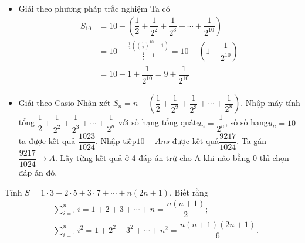 \begin{ex}
{\begin{itemize}
\begin{itemize}
\begin{align*}
					 2M&=1+\dfrac{1}{2}+\dfrac{1}{2^2}+\cdots+\dfrac{1}{2^{n-1}}\\
					\Rightarrow 2M-M&=\left(  1+\dfrac{1}{2}+\dfrac{1}{2^2}+\cdots+\dfrac{1}{2^{n-1}}\right) 1+\dfrac{1}{2}+\dfrac{1}{2^2}+\cdots+\dfrac{1}{2^{n-1}}-\left( \dfrac{1}{2}+\dfrac{1}{2^2}+\dfrac{1}{2^3}+\cdots+\dfrac{1}{2^n}\right)
				\end{align*}
				Suy ra  $M =1-\dfrac{1}{2^n}$.
				Suy ra $ S_n=n-(1-\dfrac{1}{2^n})=n-1+\dfrac{1}{2^n}$. 
				Suy ra $\Rightarrow S_{10}=10-1+\dfrac{1}{2^{10}}=9+\dfrac{1}{2^{10}}$. 
			\end{itemize}
			 \item Giải theo phương pháp trắc nghiệm
			Ta  có
			\begin{align*}
				 S_{10}&=10-\left( \dfrac{1}{2}+\dfrac{1}{2^2}+\dfrac{1}{2^3}+\cdots+\dfrac{1}{2^{10}}\right) \\
				&=10- \frac{\frac{1}{2}\left(\left(\frac{1}{2}\right)^{10}-1\right)}{\frac{1}{2}-1} = 10-  \left(1- \dfrac{1}{2^{10}} \right) \\
				 &=10-1+\dfrac{1}{2^{10}}=9+\dfrac{1}{2^{10}}
			\end{align*}
			\item Giải theo  Casio
			Nhận xét  $S_n=n-\left( \dfrac{1}{2}+\dfrac{1}{2^2}+\dfrac{1}{2^3}+\cdots+\dfrac{1}{2^n}\right)$.
			Nhập máy  tính tổng $\dfrac{1}{2}+\dfrac{1}{2^2}+\dfrac{1}{2^3}+\cdots+\dfrac{1}{2^n}$ với số hạng tổng quát$u_n=\dfrac{1}{2^n}$, số số hạng$u_n=10$ ta được kết quả $\dfrac{1023}{1024}$.
			 Nhập tiếp$10-Ans$ được kết quả$\dfrac{9217}{1024}$.
			Ta gán$\dfrac{9217}{1024}\to  A$.
			Lấy từng kết quả ở 4 đáp án trừ cho A  khi nào bằng $0$ thì chọn đáp án đó.
		\end{itemize}
	} 
\end{ex}

\begin{ex}%
	Tính $S=1\cdot 3+2\cdot 5+3\cdot  7+\cdots+n(2n+1)$. Biết rằng
	\begin{align*}
		&\sum\limits_{i=1}^n  i=1+2+3+\cdots+n=\dfrac{n(n+1)}{2};\\
		 &\sum\limits_{i=1}^n i^2=1+2^2+3^2+\cdots+n^2=\dfrac{n(n+1)(2n+1)}{6}.
	\end{align*}
\end{ex}

